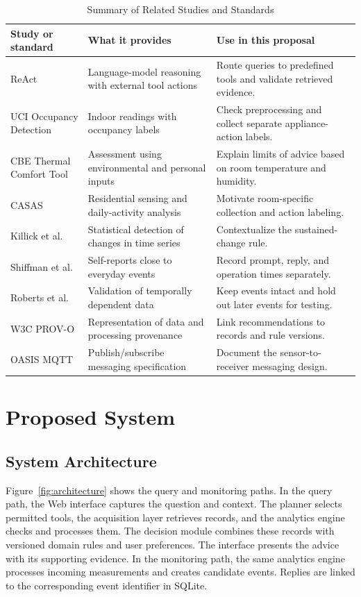 \documentclass[conference]{IEEEtran}
\begin{document}
\begin{table}[t]
\caption{Summary of Related Studies and Standards}
\label{tab:literature}
\centering\small
\begin{tabular}{@{}p{}p{}p{}@{}}
\hline
Study or standard & What it provides & Use in this proposal \\
\hline
ReAct \cite{yao2023react} & Language-model reasoning with external tool actions & Route queries to predefined tools and validate retrieved evidence. \\
UCI Occupancy Detection \cite{uci_occupancy} & Indoor readings with occupancy labels & Check preprocessing and collect separate appliance-action labels. \\
CBE Thermal Comfort Tool \cite{tartarini2020cbe} & Assessment using environmental and personal inputs & Explain limits of advice based on room temperature and humidity. \\
CASAS \cite{cook2013casas} & Residential sensing and daily-activity analysis & Motivate room-specific collection and action labeling. \\
Killick et al.\ \cite{killick2012changepoints} & Statistical detection of changes in time series & Contextualize the sustained-change rule. \\
Shiffman et al.\ \cite{shiffman2008ema} & Self-reports close to everyday events & Record prompt, reply, and operation times separately. \\
Roberts et al.\ \cite{roberts2017cv} & Validation of temporally dependent data & Keep events intact and hold out later events for testing. \\
W3C PROV-O \cite{w3c2013provo} & Representation of data and processing provenance & Link recommendations to records and rule versions. \\
OASIS MQTT \cite{oasis2019mqtt} & Publish/subscribe messaging specification & Document the sensor-to-receiver messaging design. \\
\hline
\end{tabular}
\end{table}

\section{Proposed System}
\subsection{System Architecture}
Figure~\ref{fig:architecture} shows the query and monitoring paths. In the query path, the Web interface captures the question and context. The planner selects permitted tools, the acquisition layer retrieves records, and the analytics engine checks and processes them. The decision module combines these records with versioned domain rules and user preferences. The interface presents the advice with its supporting evidence. In the monitoring path, the same analytics engine processes incoming measurements and creates candidate events. Replies are linked to the corresponding event identifier in SQLite.
\end{document}
